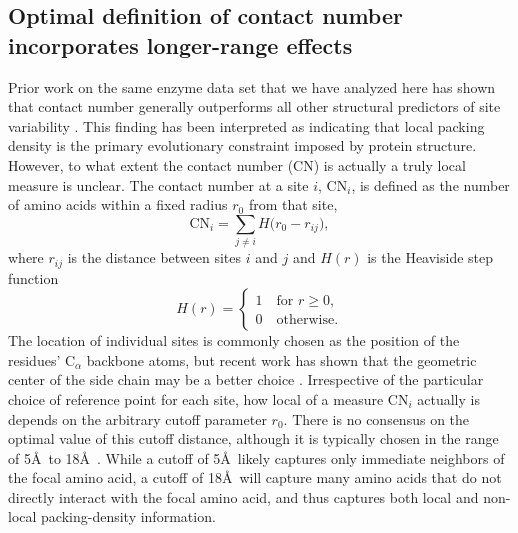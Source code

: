 \documentclass[12pt]{article}
\begin{document}
\subsection*{Optimal definition of contact number incorporates longer-range effects}

Prior work on the same enzyme data set that we have analyzed here has shown that contact number generally outperforms all other structural predictors of site variability \cite{yeh_site-specific_2014, yeh_local_2014, huang_mechanistic_2014}. This finding has been interpreted as indicating that local packing density is the primary evolutionary constraint imposed by protein structure. However, to what extent the contact number (CN) is actually a truly local measure is unclear. The contact number at a site $i$, CN$_i$, is defined as the number of amino acids within a fixed radius $r_0$ from that site,
    \begin{equation}
        \label{eqn:cn}
        \text{CN}_{i} = \sum_{j\neq i} H\big(r_0-r_{ij}\big),
    \end{equation}
where $r_{ij}$ is the distance between sites $i$ and $j$ and $H(r)$ is the Heaviside step function
    \begin{equation}
        \label{eqn:heaviside}
        H(r) = \begin{cases}
        			1 \quad\text{for $r\geq 0$,}\\
                    0 \quad\text{otherwise.}
               \end{cases}
    \end{equation}
The location of individual sites is commonly chosen as the position of the residues' C$_\alpha$ backbone atoms, but recent work has shown that the geometric center of the side chain may be a better choice \cite{marcos_too_2015}. Irrespective of the particular choice of reference point for each site, how local of a measure CN$_i$ actually is depends on the arbitrary cutoff parameter $r_0$. There is no consensus on the optimal value of this cutoff distance, although it is typically chosen in the range of 5\AA\ to 18\AA\ \cite{lin_deriving_2008, franzosa_structural_2009, weng_molecular_2014, yeh_local_2014}. While a cutoff of 5\AA\ likely captures only immediate neighbors of the focal amino acid, a cutoff of 18\AA\ will capture many amino acids that do not directly interact with the focal amino acid, and thus captures both local and non-local packing-density information.
\end{document}
